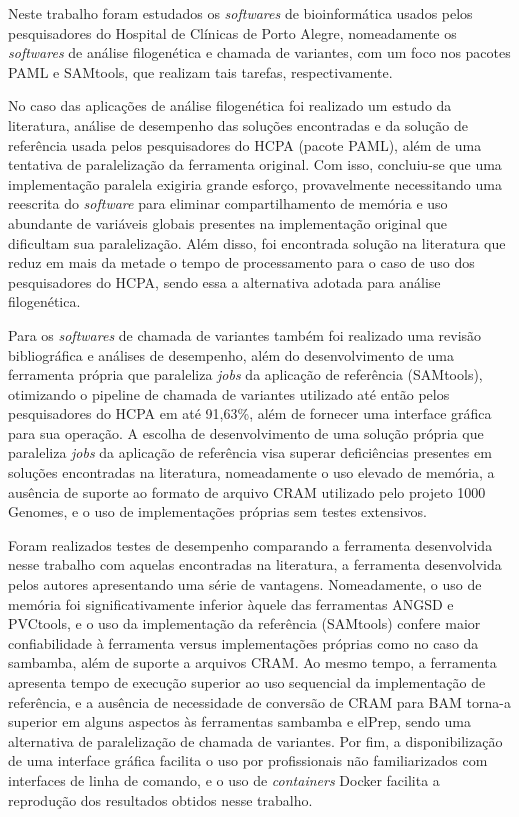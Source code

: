 \documentclass[cic,tc]{iiufrgs}
\begin{document}
Neste trabalho foram estudados os \textit{softwares} de bioinformática usados pelos
pesquisadores do Hospital de Clínicas de Porto Alegre, nomeadamente os
\textit{softwares} de análise filogenética e chamada de variantes, com um foco nos
pacotes PAML e SAMtools, que realizam tais tarefas, respectivamente.

No caso das aplicações de análise filogenética foi realizado um estudo da
literatura, análise de desempenho das soluções encontradas e da solução de
referência usada pelos pesquisadores do HCPA (pacote PAML), além de uma
tentativa de paralelização da ferramenta original. Com isso, concluiu-se
que uma implementação paralela exigiria grande esforço, provavelmente
necessitando uma reescrita do \textit{software} para eliminar compartilhamento
de memória e uso abundante de variáveis globais presentes na implementação
original que dificultam sua paralelização. Além disso, foi encontrada solução
na literatura que reduz em mais da metade o tempo de processamento para o caso
de uso dos pesquisadores do HCPA, sendo essa a alternativa adotada para análise
filogenética.

Para os \textit{softwares} de chamada de variantes também foi realizado uma revisão
bibliográfica e análises de desempenho, além do desenvolvimento de uma
ferramenta própria que paraleliza \textit{jobs} da aplicação de referência
(SAMtools), otimizando o pipeline de chamada de variantes utilizado até então
pelos pesquisadores do HCPA em até 91,63\%, além de fornecer uma interface gráfica para sua
operação. A escolha de desenvolvimento de uma solução própria que paraleliza
\textit{jobs} da aplicação de referência visa superar deficiências presentes em
soluções encontradas na literatura, nomeadamente o uso elevado de memória, a
ausência de suporte ao formato de arquivo CRAM utilizado pelo projeto 1000
Genomes, e o uso de implementações próprias sem testes extensivos.

Foram realizados testes de desempenho comparando a ferramenta desenvolvida
nesse trabalho com aquelas encontradas na literatura, a ferramenta desenvolvida
pelos autores apresentando uma série de vantagens. Nomeadamente, o uso de
memória foi significativamente inferior àquele das ferramentas ANGSD e
PVCtools, e o uso da implementação da referência (SAMtools) confere maior
confiabilidade à ferramenta versus implementações próprias como no caso da
sambamba, além de suporte a arquivos CRAM. Ao mesmo tempo, a ferramenta
apresenta tempo de execução superior ao uso sequencial da implementação de
referência, e a ausência de necessidade de conversão de CRAM para BAM torna-a
superior em alguns aspectos às ferramentas sambamba e elPrep, sendo uma
alternativa de paralelização de chamada de variantes. Por fim, a
disponibilização de uma interface gráfica facilita o uso por profissionais não
familiarizados com interfaces de linha de comando, e o uso de \textit{containers} Docker
facilita a reprodução dos resultados obtidos nesse trabalho.
\end{document}
